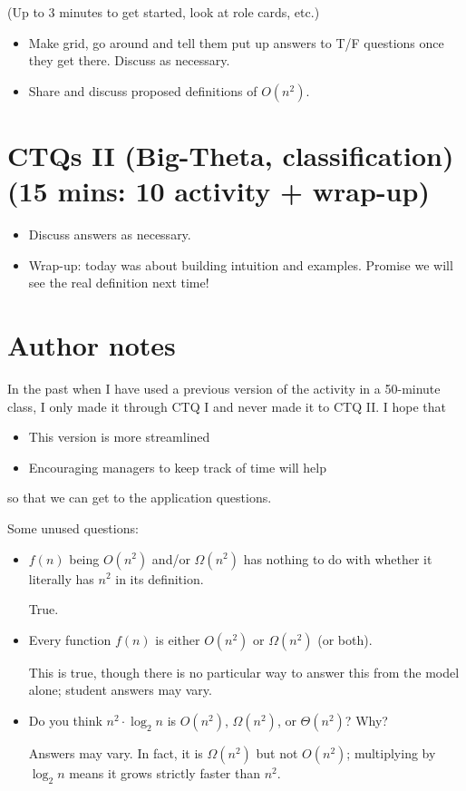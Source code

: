 \documentclass{tufte-handout}
\begin{document}
(Up to 3 minutes to get started, look at role cards, etc.)

\begin{itemize}
\item Make grid, go around and tell them put up answers to T/F
  questions once they get there.  Discuss as necessary.
\item Share and discuss proposed definitions of $O(n^2)$.
\end{itemize}

\section{CTQs II (Big-Theta, classification) (15 mins: 10 activity + wrap-up)}

\begin{itemize}
\item Discuss answers as necessary.
\item Wrap-up: today was about building intuition and
  examples. Promise we will see the real definition next time!
\end{itemize}

\newpage

\section{Author notes}
\label{sec:author}

In the past when I have used a previous version of the activity in a
50-minute class, I only made it through CTQ I and never made it to CTQ
II.  I hope that
\begin{itemize}
\item This version is more streamlined
\item Encouraging managers to keep track of time will help
\end{itemize}
so that we can get to the application questions.

Some unused questions:

\begin{itemize}
\item $f(n)$ being $O(n^2)$ and/or $\Omega(n^2)$ has nothing to do
  with whether it literally has $n^2$ in its definition.
  \begin{answer} True. \end{answer}

\item Every function $f(n)$ is either $O(n^2)$ or $\Omega(n^2)$ (or
  both).
  \begin{answer}
    This is true, though there is no particular way to answer this
    from the model alone; student answers may vary.
  \end{answer}
\item Do you think $n^2 \cdot \log_2 n$ is $O(n^2)$, $\Omega(n^2)$, or
  $\Theta(n^2)$?  Why?
  \begin{answer}
    Answers may vary.  In fact, it is $\Omega(n^2)$ but not $O(n^2)$;
    multiplying by $\log_2 n$ means it grows strictly faster than
    $n^2$.
  \end{answer}
\end{itemize}
\end{document}
